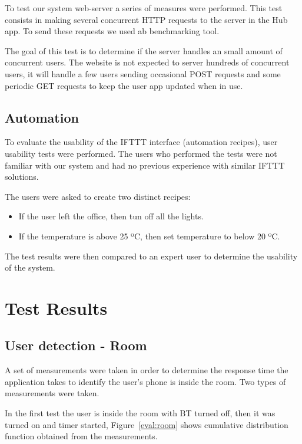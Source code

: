 To test our system web-server a series of measures were performed. This test consists in making several concurrent \ac{HTTP} requests to the server in the Hub app. To send these requests we used \ac{ab} benchmarking tool.

The goal of this test is to determine if the server handles an small amount of concurrent users. The website is not expected to server hundreds of concurrent users, it will handle a few users sending occasional POST requests and some periodic GET requests to keep the user app updated when in use.


\subsection{Automation}

To evaluate the usability of the \ac{IFTTT} interface (automation recipes), user usability tests were performed. The users who performed the tests were not familiar with our system and had no previous experience with similar \ac{IFTTT} solutions.

The users were asked to create two distinct recipes:

\begin{itemize}
  \item If the user left the office, then tun off all the lights.
  \item If the temperature is above 25 ºC, then set temperature to below 20 ºC. 
\end{itemize} 

The test results were then compared to an expert user to determine the usability of the system.



\section{Test Results}


\subsection{User detection - Room}

A set of measurements were taken in order to determine the response time the application takes to identify the user's phone is inside the room. Two types of measurements were taken.

In the first test the user is inside the room with \ac{BT} turned off, then it was turned on and timer started, Figure~\ref{eval:room} shows cumulative distribution function obtained from the measurements. 

